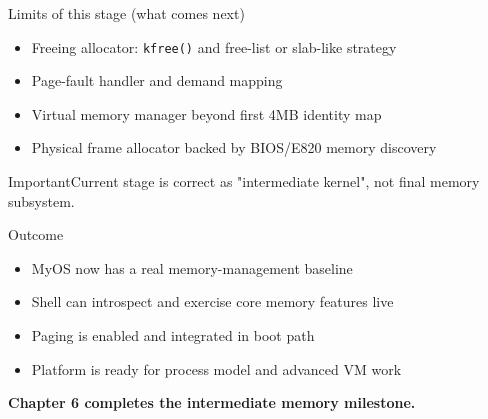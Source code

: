 \documentclass[aspectratio=169]{beamer}
\newcommand{\warn}[1]{%
  \begin{alertblock}{Important}\smallskip #1\smallskip\end{alertblock}\vspace{5pt}}
\begin{document}
\begin{frame}{Limits of this stage (what comes next)}
  \begin{itemize}
    \item Freeing allocator: \texttt{kfree()} and free-list or slab-like strategy
    \item Page-fault handler and demand mapping
    \item Virtual memory manager beyond first 4MB identity map
    \item Physical frame allocator backed by BIOS/E820 memory discovery
  \end{itemize}
  \warn{Current stage is correct as "intermediate kernel", not final memory subsystem.}
\end{frame}

\begin{frame}{Outcome}
  \begin{itemize}
    \item MyOS now has a real memory-management baseline
    \item Shell can introspect and exercise core memory features live
    \item Paging is enabled and integrated in boot path
    \item Platform is ready for process model and advanced VM work
  \end{itemize}
  \vspace{8pt}
  \begin{center}
    \Large \textbf{Chapter 6 completes the intermediate memory milestone.}
  \end{center}
\end{frame}
\end{document}
